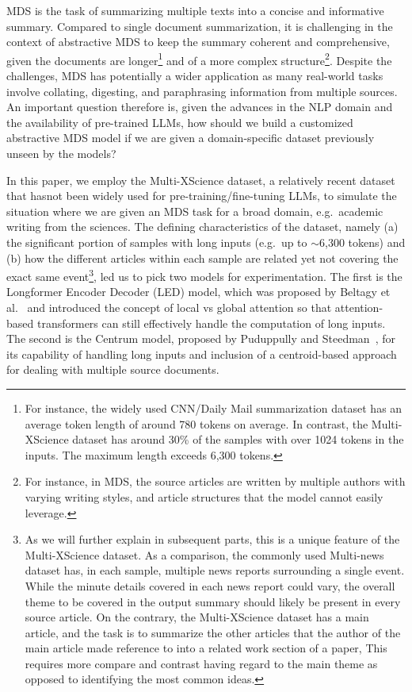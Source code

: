 \documentclass[12pt, twocolumn]{article}
\numberwithin{equation}{section}
\begin{document}
MDS is the task of summarizing multiple texts into a concise and informative summary. Compared to single document summarization, it is challenging in the context of abstractive MDS to keep the summary coherent and comprehensive, given the documents are longer\footnote{For instance, the widely used CNN/Daily Mail summarization dataset has an average token length of around 780 tokens on average.  In contrast, the Multi-XScience dataset has around 30\% of the samples with over 1024 tokens in the inputs.  The maximum length exceeds 6,300 tokens.} and of a more complex structure\footnote{For instance, in MDS, the source articles are written by multiple authors with varying writing styles, and article structures that the model cannot easily leverage.}. Despite the challenges, MDS has potentially a wider application as many real-world tasks involve collating, digesting, and paraphrasing information from multiple sources.  An important question therefore is, given the advances in the NLP domain and the availability of pre-trained LLMs, how should we build a customized abstractive MDS model if we are given a domain-specific dataset previously unseen by the models?  

In this paper, we employ the Multi-XScience dataset, a relatively recent dataset that hasnot been widely used for pre-training/fine-tuning LLMs, to simulate the situation where we are given an MDS task for a broad domain, e.g.~academic writing from the sciences.  The defining characteristics of the dataset, namely (a) the significant portion of samples with long inputs (e.g.~up to $\sim$6,300 tokens) and (b) how the different articles within each sample are related yet not covering the exact same event\footnote{As we will further explain in subsequent parts, this is a unique feature of the Multi-XScience dataset.  As a comparison, the commonly used Multi-news dataset has, in each sample, multiple news reports surrounding a single event.  While the minute details covered in each news report could vary, the overall theme to be covered in the output summary should likely be present in every source article.  On the contrary, the Multi-XScience dataset has a main article, and the task is to summarize the other articles that the author of the main article made reference to into a related work section of a paper,  This requires more compare and contrast having regard to the main theme as opposed to identifying the most common ideas.}, led us to pick two models for experimentation.  The first is the Longformer Encoder Decoder (LED) model, which was proposed by Beltagy et al.~\cite{beltagy2020longformer} and introduced the concept of local vs global attention so that attention-based transformers can still effectively handle the computation of long inputs.   The second is the Centrum model, proposed by Puduppully and Steedman~\cite{puduppully2022multidocument}, for its capability of handling long inputs and inclusion of a centroid-based approach for dealing with multiple source documents. 
\end{document}
